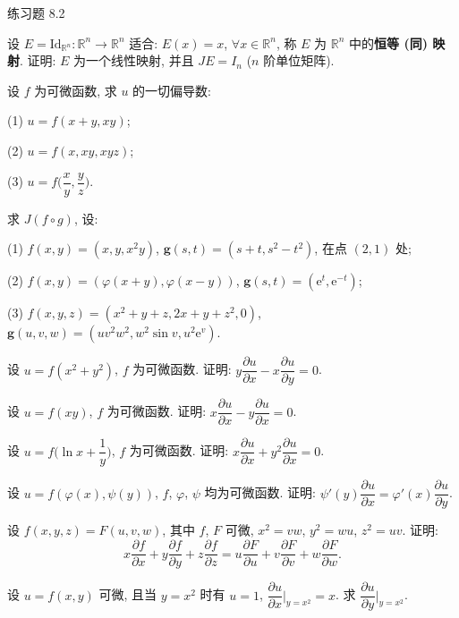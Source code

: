 \begin{exblock}{练习题 8.2}
  \item 设 $E = \mathrm{Id}_{\mathbb{R}^{n}}: \mathbb{R}^{n} \to \mathbb{R}^{n}$ 适合: $E(x) = x$, $\forall x \in \mathbb{R}^{n}$, 称 $E$ 为 $\mathbb{R}^{n}$ 中的\textbf{恒等 (同) 映射}. 证明: $E$ 为一个线性映射, 并且 $JE = I_{n}$ ($n$ 阶单位矩阵).

  \item 设 $f$ 为可微函数, 求 $u$ 的一切偏导数:

  (1) $u = f(x + y, xy)$;

  (2) $u = f(x, xy, xyz)$;

  (3) $u = f\Big(\dfrac{x}{y}, \dfrac{y}{z}\Big)$.

  \item 求 $J(f \circ g)$, 设:

  (1) $f(x, y) = (x, y, x^{2}y)$, $\boldsymbol{g}(s, t) = (s + t, s^{2} - t^{2})$, 在点 $(2, 1)$ 处;

  (2) $f(x, y) = (\varphi(x + y), \varphi(x - y))$, $\boldsymbol{g}(s, t) = (\mathrm{e}^{t}, \mathrm{e}^{-t})$;

  (3) $f(x, y, z) = (x^{2} + y + z, 2x + y + z^{2}, 0)$, $\boldsymbol{g}(u, v, w) = (uv^{2}w^{2}, w^{2}\sin v, u^{2}\mathrm{e}^{v})$.

  \item 设 $u = f(x^{2} + y^{2})$, $f$ 为可微函数. 证明: $y\dfrac{\partial u}{\partial x} - x\dfrac{\partial u}{\partial y} = 0$.

  \item 设 $u = f(xy)$, $f$ 为可微函数. 证明: $x\dfrac{\partial u}{\partial x} - y\dfrac{\partial u}{\partial x} = 0$.

  \item 设 $u = f\Big(\ln x + \dfrac{1}{y}\Big)$, $f$ 为可微函数. 证明: $x\dfrac{\partial u}{\partial x} + y^{2}\dfrac{\partial u}{\partial x} = 0$.

  \item 设 $u = f(\varphi(x), \psi(y))$, $f$, $\varphi$, $\psi$ 均为可微函数. 证明: $\psi'(y)\dfrac{\partial u}{\partial x} = \varphi'(x)\dfrac{\partial u}{\partial y}$.

  \item 设 $f(x, y, z) = F(u, v, w)$, 其中 $f$, $F$ 可微, $x^{2} = vw$, $y^{2} = wu$, $z^{2} = uv$. 证明:
  \[
    x\frac{\partial f}{\partial x} + y\frac{\partial f}{\partial y} + z\frac{\partial f}{\partial z} = u\frac{\partial F}{\partial u} + v\frac{\partial F}{\partial v} + w\frac{\partial F}{\partial w}.
  \]

  \item 设 $u = f(x, y)$ 可微, 且当 $y = x^{2}$ 时有 $u = 1$, $\dfrac{\partial u}{\partial x}\Big|_{y = x^{2}} = x$. 求 $\dfrac{\partial u}{\partial y}\Big|_{y = x^{2}}$.


\end{exblock}
